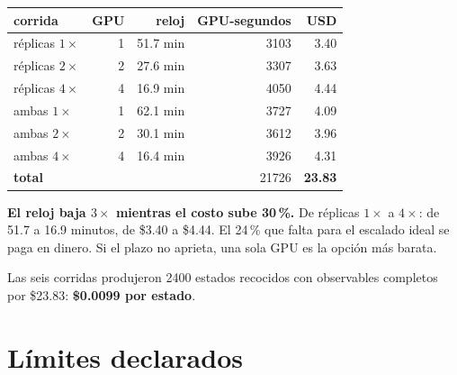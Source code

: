 \documentclass[11pt,a4paper]{article}
\begin{document}
\begin{table}[h]\centering
\begin{tabular}{lrrrr}
\toprule
corrida & GPU & reloj & GPU-segundos & USD \\
\midrule
r\'eplicas $1\times$ & 1 & 51.7 min & \num{3103} & 3.40 \\
r\'eplicas $2\times$ & 2 & 27.6 min & \num{3307} & 3.63 \\
r\'eplicas $4\times$ & 4 & 16.9 min & \num{4050} & 4.44 \\
ambas $1\times$ & 1 & 62.1 min & \num{3727} & 4.09 \\
ambas $2\times$ & 2 & 30.1 min & \num{3612} & 3.96 \\
ambas $4\times$ & 4 & 16.4 min & \num{3926} & 4.31 \\
\midrule
\textbf{total} & & & \num{21726} & \textbf{23.83} \\
\bottomrule
\end{tabular}
\end{table}

\textbf{El reloj baja $3\times$ mientras el costo sube 30\,\%.} De r\'eplicas
$1\times$ a $4\times$: de 51.7 a 16.9 minutos, de \$3.40 a \$4.44. El 24\,\% que
falta para el escalado ideal se paga en dinero. Si el plazo no aprieta, una sola
GPU es la opci\'on m\'as barata.

Las seis corridas produjeron \num{2400} estados recocidos con observables
completos por \$23.83: \textbf{\$0.0099 por estado}.

\section{L\'imites declarados}
\end{document}
